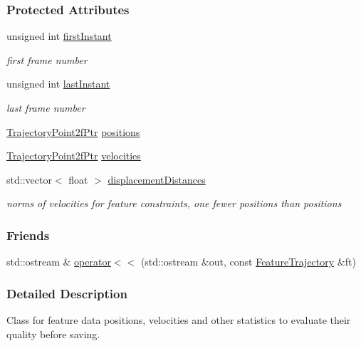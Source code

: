 \subsubsection*{Protected Attributes}
\begin{DoxyCompactItemize}
\item 
unsigned int \hyperlink{classFeatureTrajectory_a2a6edaac8722d353f8168e4149333761}{first\-Instant}
\begin{DoxyCompactList}\small\item\em first frame number \end{DoxyCompactList}\item 
unsigned int \hyperlink{classFeatureTrajectory_a3d6bc8bd9e02f2d56deb60f6fb22a36b}{last\-Instant}
\begin{DoxyCompactList}\small\item\em last frame number \end{DoxyCompactList}\item 
\hyperlink{Motion_8hpp_a8f08058062f917b510f6fb9de6d4b52b}{Trajectory\-Point2f\-Ptr} \hyperlink{classFeatureTrajectory_a1ae33a4db55f46436c1f40603fb74f77}{positions}
\item 
\hyperlink{Motion_8hpp_a8f08058062f917b510f6fb9de6d4b52b}{Trajectory\-Point2f\-Ptr} \hyperlink{classFeatureTrajectory_a0aaf4f9bc0b82f6837abe1c5b8e74b50}{velocities}
\item 
std\-::vector$<$ float $>$ \hyperlink{classFeatureTrajectory_aa3e3c81a9b7f1807dba0ee8624cbc70e}{displacement\-Distances}
\begin{DoxyCompactList}\small\item\em norms of velocities for feature constraints, one fewer positions than positions \end{DoxyCompactList}\end{DoxyCompactItemize}
\subsubsection*{Friends}
\begin{DoxyCompactItemize}
\item 
std\-::ostream \& \hyperlink{classFeatureTrajectory_abe63025d76abe11e52e9e0ca214b3646}{operator$<$$<$} (std\-::ostream \&out, const \hyperlink{classFeatureTrajectory}{Feature\-Trajectory} \&ft)
\end{DoxyCompactItemize}


\subsubsection{Detailed Description}
Class for feature data positions, velocities and other statistics to evaluate their quality before saving. 

